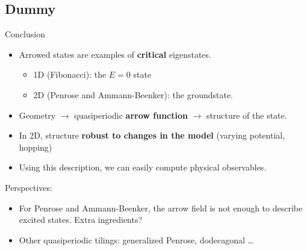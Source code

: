 \documentclass[xcolor=x11names,compress,professionalfonts, aspectratio=169]{beamer}
\renewcommand{\(}{\begin{columns}}
\renewcommand{\)}{\end{columns}}
\newcommand{\<}[1]{\begin{column}{#1}}
\renewcommand{\>}{\end{column}}
\begin{document}
\subsection{Dummy}
\begin{frame}{Conclusion}
\begin{itemize}
	\item Arrowed states are examples of \textbf{critical} eigenstates.
	\begin{itemize}
		\item 1D (Fibonacci): the $E=0$ state
		\item 2D (Penrose and Ammann-Beenker): the groundstate.
	\end{itemize}
	\item Geometry $\rightarrow$ quasiperiodic \textbf{arrow function} $\rightarrow$ structure of the state.
	\item In 2D, structure \textbf{robust to changes in the model} (varying potential, hopping)
	\item Using this description, we can easily compute physical observables.
\end{itemize}
Perspectives:
\begin{itemize}
	\item For Penrose and Ammann-Beenker, the arrow field is not enough to describe excited states. Extra ingredients?
	\item Other quasiperiodic tilings: generalized Penrose, dodecagonal \dots
\end{itemize}
\end{frame}
\end{document}
